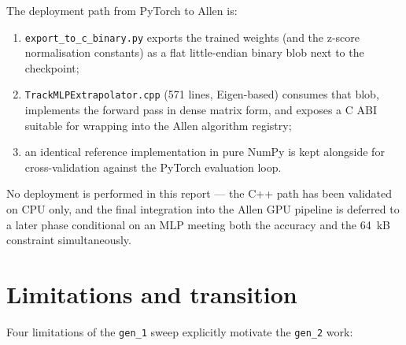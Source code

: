 \documentclass[a4paper,11pt]{article}
\newcommand{\SI}[2]{#1~#2}
\newcommand{\kilo}{k}
\newcommand{\byte}{B}
\begin{document}
The deployment path from PyTorch to Allen is:
\begin{enumerate}\setlength{\itemsep}{1pt}
\item \texttt{export\_to\_c\_binary.py} exports the trained weights (and
  the z-score normalisation constants) as a flat little-endian binary
  blob next to the checkpoint;
\item \texttt{TrackMLPExtrapolator.cpp} (571 lines, Eigen-based)
  consumes that blob, implements the forward pass in dense matrix form,
  and exposes a C ABI suitable for wrapping into the Allen algorithm
  registry;
\item an identical reference implementation in pure NumPy is kept
  alongside for cross-validation against the PyTorch evaluation loop.
\end{enumerate}
No deployment is performed in this report --- the C++ path has been
validated on CPU only, and the final integration into the Allen GPU
pipeline is deferred to a later phase conditional on an MLP meeting
both the accuracy and the \SI{64}{\kilo\byte} constraint
simultaneously.

\section{Limitations and transition}\label{gen1:sec:limitations}

Four limitations of the \texttt{gen\_1} sweep explicitly motivate the
\texttt{gen\_2} work:
\end{document}
